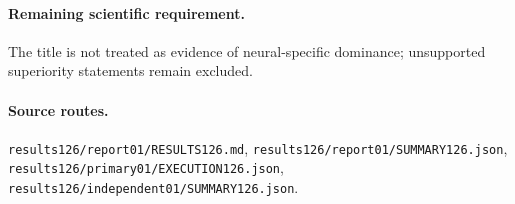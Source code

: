 \paragraph{Remaining scientific requirement.} The title is not treated as evidence of neural-specific dominance; unsupported superiority statements remain excluded.

\paragraph{Source routes.} \nolinkurl{results126/report01/RESULTS126.md}, \nolinkurl{results126/report01/SUMMARY126.json}, \nolinkurl{results126/primary01/EXECUTION126.json}, \nolinkurl{results126/independent01/SUMMARY126.json}.

